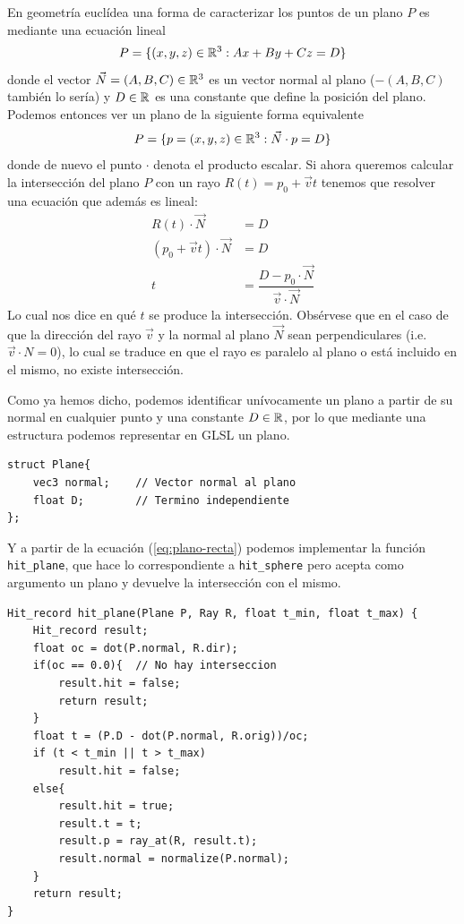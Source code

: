 En geometría euclídea una forma de caracterizar los puntos de un plano $P$ es mediante una ecuación lineal
$$
P = \{(x,y,z)\in\mathbb{R}^3:Ax+By+Cz=D\}
$$
donde el vector $\vec N=(A,B,C)\in\mathbb{R}^3$ es un vector normal al plano ($-(A,B,C)$ también lo sería) y $D\in\mathbb{R}$ es una constante que define la posición del plano. Podemos entonces ver un plano de la siguiente forma equivalente
$$
P = \{p=(x,y,z)\in\mathbb{R}^3:\vec N\cdot p = D\}
$$
donde de nuevo el punto $\cdot$ denota el producto escalar. Si ahora queremos calcular la intersección del plano $P$ con un rayo $R(t)=p_0+\vec vt$ tenemos que resolver una ecuación que además es lineal:
\begin{equation}
    \label{eq:plano-recta}
    \begin{split}
        R(t)\cdot \vec N &= D \\
        (p_0+\vec vt)\cdot \vec N & = D\\
        t &=\dfrac{D-p_0\cdot \vec N}{\vec v\cdot \vec N}
    \end{split}
\end{equation}
Lo cual nos dice en qué $t$ se produce la intersección. Obsérvese que en el caso de que la dirección del rayo $\vec v$ y la normal al plano $\vec N$ sean perpendiculares (i.e. $\vec v\cdot N=0$), lo cual se traduce en que el rayo es paralelo al plano o está incluido en el mismo, no existe intersección.

Como ya hemos dicho, podemos identificar unívocamente un plano a partir de su normal en cualquier punto y una constante $D\in\mathbb{R}$, por lo que mediante una estructura podemos representar en GLSL un plano.

\begin{lstlisting}
struct Plane{
    vec3 normal;    // Vector normal al plano
    float D;        // Termino independiente
};
\end{lstlisting}

Y a partir de la ecuación (\ref{eq:plano-recta}) podemos implementar la función \verb|hit_plane|, que hace lo correspondiente a \verb|hit_sphere| pero acepta como argumento un plano y devuelve la intersección con el mismo.

\begin{lstlisting}
Hit_record hit_plane(Plane P, Ray R, float t_min, float t_max) {
    Hit_record result;
    float oc = dot(P.normal, R.dir);
    if(oc == 0.0){  // No hay interseccion
        result.hit = false;
        return result;
    }
    float t = (P.D - dot(P.normal, R.orig))/oc;
    if (t < t_min || t > t_max)
        result.hit = false;
    else{
        result.hit = true;
        result.t = t;
        result.p = ray_at(R, result.t);
        result.normal = normalize(P.normal);
    }
    return result;
}
\end{lstlisting}

